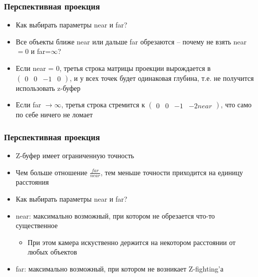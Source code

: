\documentclass[10pt]{beamer}
\begin{document}
\begin{frame}[fragile]
\frametitle{Перспективная проекция}
\begin{itemize}
\item Как выбирать параметры near и far?
\pause
\item Все объекты ближе near или дальше far обрезаются -- почему не взять near\begin{math}= 0\end{math} и far=\begin{math}\infty\end{math}?
\pause
\item Если near = 0, третья строка матрицы проекции вырождается в \begin{math}\begin{pmatrix}0 & 0 & -1 & 0\end{pmatrix}\end{math}, и у всех точек будет одинаковая глубина, т.е. не получится использовать z-буфер
\pause
\item Если far \begin{math}\rightarrow\infty\end{math}, третья строка стремится к \begin{math}\begin{pmatrix}0 & 0 & -1 & -2near\end{pmatrix}\end{math}, что само по себе ничего не ломает
\end{itemize}
\end{frame}

\begin{frame}[fragile]
\frametitle{Перспективная проекция}
\begin{itemize}
\item Z-буфер имеет ограниченную точность
\pause
\item Чем больше отношение \begin{math}\frac{far}{near}\end{math}, тем меньше точности приходится на единицу расстояния
\pause
\item Как выбирать параметры near и far?
\pause
\item near: максимально возможный, при котором не обрезается что-то существенное
\begin{itemize}
\item При этом камера искуственно держится на некотором расстоянии от любых объектов
\end{itemize}
\pause
\item far: максимально возможный, при котором не возникает Z-fighting'а
\end{itemize}
\end{frame}
\end{document}
